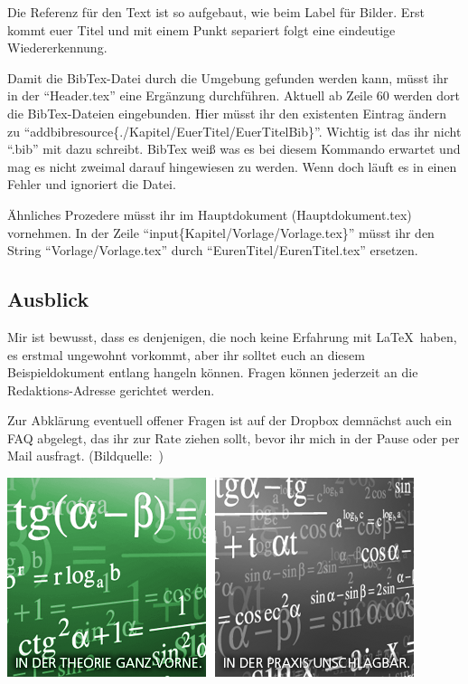 \begin{multicols}{3}

Die Referenz für den Text ist so aufgebaut, wie beim Label für Bilder. Erst kommt euer Titel und mit einem Punkt separiert folgt eine eindeutige Wiedererkennung.

Damit die BibTex-Datei durch die Umgebung gefunden werden kann, müsst ihr in der \enquote{Header.tex} eine Ergänzung durchführen. Aktuell ab Zeile 60 werden dort die BibTex-Dateien eingebunden. Hier müsst ihr den existenten Eintrag ändern zu \enquote{addbibresource\{./Kapitel/EuerTitel/EuerTitelBib\}}. Wichtig ist das ihr nicht \enquote{.bib} mit dazu schreibt. BibTex weiß was es bei diesem Kommando erwartet und mag es nicht zweimal darauf hingewiesen zu werden. Wenn doch läuft es in einen Fehler und ignoriert die Datei.

Ähnliches Prozedere müsst ihr im Hauptdokument (Hauptdokument.tex) vornehmen. In der Zeile \enquote{input\{Kapitel/Vorlage/Vorlage.tex\}} müsst ihr den String \enquote{Vorlage/Vorlage.tex} durch \enquote{EurenTitel/EurenTitel.tex} ersetzen. 

\subsection*{Ausblick}
Mir ist bewusst, dass es denjenigen, die noch keine Erfahrung mit \LaTeX~haben, es erstmal ungewohnt vorkommt, aber ihr solltet euch an diesem Beispieldokument entlang hangeln können. Fragen können jederzeit an die Redaktions-Adresse gerichtet werden.

Zur Abklärung eventuell offener Fragen ist auf der Dropbox demnächst auch ein FAQ abgelegt, das ihr zur Rate ziehen sollt, bevor ihr mich in der Pause oder per Mail ausfragt. (Bildquelle:~\cite{vorlage.8})

\printbibliography[segment=1,heading=subbibliography]
\end{multicols}
\begin{Figure}
\includegraphics[width=\linewidth]{Kapitel/Vorlage/Grafiken/sg_ft_zemath.png}
\end{Figure}

\newpage